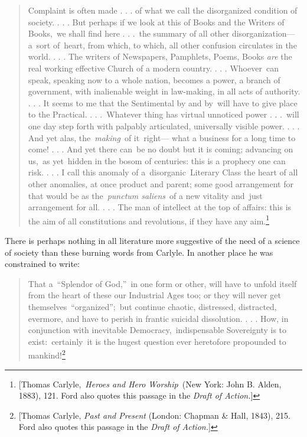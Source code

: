 \documentclass[openany,nobib]{tufte-book}
\begin{document}
\begin{quote}
Complaint is often made . . . of what we call the disorganized condition
of society. . . . But perhaps if we look at this of Books and the
Writers of Books,~we shall find here . . .~the summary of all other
disorganization---a~sort of~heart, from which, to which, all other
confusion circulates in the world. . . . The writers of Newspapers,
Pamphlets, Poems, Books \emph{are} the real working effective Church of
a modern country. . . . Whoever~can speak, speaking now to a whole
nation, becomes a power, a branch of government, with inalienable weight
in law-making, in all acts of authority. . . . It seems to me that the
Sentimental by and by~will have to give place to the Practical. . .
.~Whatever thing has virtual unnoticed power . . .~will one day step
forth with palpably articulated, universally visible power. . . . And
yet alas, the~\emph{making}~of it~right--- what a business for a long
time to come! . . . And yet there can~be no doubt but it is coming;
advancing on us,~as yet~hidden in the bosom of centuries: this is a
prophecy one can risk. . . . I call this anomaly of
a~disorganic~Literary Class the heart of all other anomalies, at once
product and parent; some good arrangement for that would be as
the~\emph{punctum saliens}~of a new vitality and~just arrangement for
all. . . . The man of intellect at the top of affairs: this is the aim
of all constitutions and revolutions, if they have any aim.\footnote{{[}Thomas
  Carlyle,~\emph{Heroes and Hero Worship~}(New York: John B. Alden,
  1883), 121. Ford also quotes this passage in the \emph{Draft of
  Action.}{]}}~
\end{quote}
There is perhaps nothing in all literature more suggestive of the need
of a science of society than these burning words from Carlyle. In another place he was constrained to write:~
\enlargethispage{-\baselineskip}
\begin{quote}
That a~``Splendor of God,''~in one form or other, will have to unfold
itself from the heart of these our Industrial Ages too; or they will
never get themselves~``organized'';~but continue chaotic, distressed,
distracted, evermore, and have to perish in frantic suicidal
dissolution. . . . How, in conjunction with inevitable
Democracy,~indispensable Sovereignty is to exist:~certainly~it is the
hugest question ever heretofore propounded to mankind!\footnote{{[}Thomas
  Carlyle, \emph{Past and Present} (London: Chapman \& Hall, 1843), 215.
  Ford also quotes this passage in the \emph{Draft of Action.}{]}}~
\end{quote}
\end{document}
